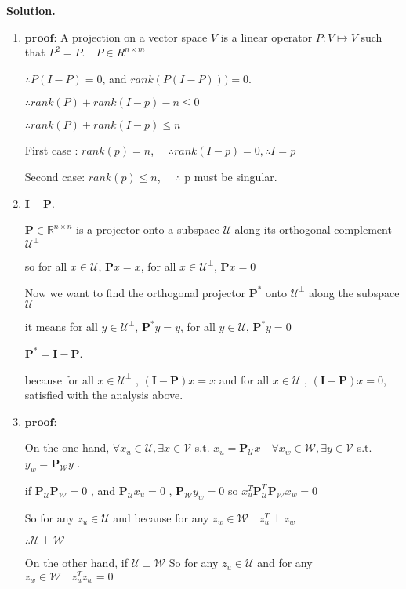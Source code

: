 \documentclass[english,onecolumn]{IEEEtran}
\newcommand{\Rbb}{\mathbb{R}}
\newcommand{\Pb}{\mathbf{P}}
\newcommand{\Ucal}{\mathcal{U}}
\newcommand{\Wcal}{\mathcal{W}}
\begin{document}
\noindent
\textbf{Solution.}
\begin{enumerate}
	\item $\textbf{proof}$:
	A projection on a vector space $V$ is a linear operator $P: V \mapsto V$ such that $P^{2}=P$.$\quad P \in R^{n \times m}$
	
	$\therefore P(I-P) = 0$, and $rank(P(I-P))) = 0$. 
	
	$\therefore rank(P) + rank(I-p) - n \leq 0$
	
	$\therefore rank(P) + rank(I-p)  \leq n$
	
	First case : $rank(p) = n$, $\quad \therefore rank(I-p) = 0, \therefore I=p$
	
	Second case: $rank(p) \leq n$, $\quad \therefore$ p must be singular.
	
	\item $\textbf{I} -\Pb$.
	
	$\Pb\in \Rbb^{n\times n}$ is a projector onto a subspace $\mathcal{U}$ along its orthogonal complement $\mathcal{U}^{\perp}$
	
	so for all $x \in \mathcal{U}$,  $\Pb x = x$, for all $x \in \mathcal{U}^{\perp}$, $\Pb x = 0$
	
	Now we want to find the orthogonal projector $\Pb^*$ onto $\mathcal{U}^{\perp}$ along the subspace $\mathcal{U}$
	
	it means for all $y \in \mathcal{U^{\perp}}$,  $\Pb^* y = y$, for all $y \in \mathcal{U}$, $\Pb^* y = 0$
	
	$\Pb^* = \textbf{I} -\Pb$.
	
	because for all $x \in \mathcal{U}^{\perp}$ , $(\textbf{I} -\Pb)x = x$ and for all $x \in \mathcal{U}$ , $(\textbf{I} -\Pb)x = 0$, satisfied with the  analysis above.
	
	\item $\textbf{proof}$: 
	
	
	On the one hand, $\forall x_u \in \mathcal{U} , \exists x \in \mathcal{V}$ s.t. $ x_{u} = \Pb_{\Ucal} x \quad \forall x_w \in \mathcal{W} ,\exists y \in \mathcal{V}$ s.t. $ y_{w} =\Pb_{\Wcal}  y$  . 
	
	if $\Pb_{\Ucal} \Pb_{\Wcal}  = 0$ , and $\Pb_{\Ucal}  x_{u} = 0$ , $\Pb_{\Wcal}  y_{w} = 0$ so $x_{u}^T \Pb_{\Ucal}^T \Pb_{\Wcal} x_{w}= 0$
		
	So for any $z_u \in \Ucal$  and because for any $z_w \in \Wcal \quad z_u^T  \perp z_w$
	
	$\therefore \Ucal \perp \Wcal$
	
	On the other hand, if $\Ucal \perp \Wcal$   So for any $z_u \in \Ucal$  and for any $z_w \in \Wcal \quad z_u^T z_w = 0$
	

\end{enumerate}
\end{document}
